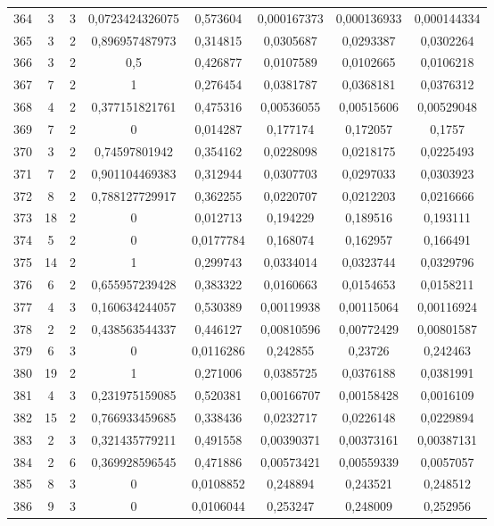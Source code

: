 \begin{longtable}{|c|c|c|c|c|c|c|c|}
364 & 3 & 3 & 0,0723424326075 & 0,573604 & 0,000167373 & 0,000136933 & 0,000144334  \\
365 & 3 & 2 & 0,896957487973 & 0,314815 & 0,0305687 & 0,0293387 & 0,0302264  \\
366 & 3 & 2 & 0,5 & 0,426877 & 0,0107589 & 0,0102665 & 0,0106218  \\
367 & 7 & 2 & 1 & 0,276454 & 0,0381787 & 0,0368181 & 0,0376312  \\
368 & 4 & 2 & 0,377151821761 & 0,475316 & 0,00536055 & 0,00515606 & 0,00529048  \\
369 & 7 & 2 & 0 & 0,014287 & 0,177174 & 0,172057 & 0,1757  \\
370 & 3 & 2 & 0,74597801942 & 0,354162 & 0,0228098 & 0,0218175 & 0,0225493  \\
371 & 7 & 2 & 0,901104469383 & 0,312944 & 0,0307703 & 0,0297033 & 0,0303923  \\
372 & 8 & 2 & 0,788127729917 & 0,362255 & 0,0220707 & 0,0212203 & 0,0216666  \\
373 & 18 & 2 & 0 & 0,012713 & 0,194229 & 0,189516 & 0,193111  \\
374 & 5 & 2 & 0 & 0,0177784 & 0,168074 & 0,162957 & 0,166491  \\
375 & 14 & 2 & 1 & 0,299743 & 0,0334014 & 0,0323744 & 0,0329796  \\
376 & 6 & 2 & 0,655957239428 & 0,383322 & 0,0160663 & 0,0154653 & 0,0158211  \\
377 & 4 & 3 & 0,160634244057 & 0,530389 & 0,00119938 & 0,00115064 & 0,00116924  \\
378 & 2 & 2 & 0,438563544337 & 0,446127 & 0,00810596 & 0,00772429 & 0,00801587  \\
379 & 6 & 3 & 0 & 0,0116286 & 0,242855 & 0,23726 & 0,242463  \\
380 & 19 & 2 & 1 & 0,271006 & 0,0385725 & 0,0376188 & 0,0381991  \\
381 & 4 & 3 & 0,231975159085 & 0,520381 & 0,00166707 & 0,00158428 & 0,0016109  \\
382 & 15 & 2 & 0,766933459685 & 0,338436 & 0,0232717 & 0,0226148 & 0,0229894  \\
383 & 2 & 3 & 0,321435779211 & 0,491558 & 0,00390371 & 0,00373161 & 0,00387131  \\
384 & 2 & 6 & 0,369928596545 & 0,471886 & 0,00573421 & 0,00559339 & 0,0057057  \\
385 & 8 & 3 & 0 & 0,0108852 & 0,248894 & 0,243521 & 0,248512  \\
386 & 9 & 3 & 0 & 0,0106044 & 0,253247 & 0,248009 & 0,252956  \\

\end{longtable}
